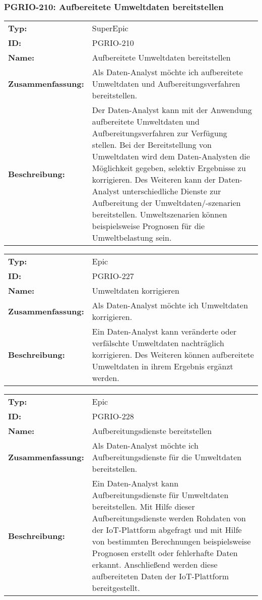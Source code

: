 	\subsubsection{PGRIO-210: Aufbereitete Umweltdaten bereitstellen} 
\begin{flushleft} 
\begin{tabular}{@{}lp{100mm}} 
\textbf{Typ:} & SuperEpic \\ 
\textbf{ID:} & PGRIO-210 \\ 
\textbf{Name:} & Aufbereitete Umweltdaten bereitstellen \\ 
\textbf{Zusammenfassung:} & Als Daten-Analyst möchte ich aufbereitete Umweltdaten und Aufbereitungsverfahren bereitstellen. \\ 
\textbf{Beschreibung:} & Der Daten-Analyst kann mit der Anwendung aufbereitete Umweltdaten und Aufbereitungsverfahren zur Verfügung stellen. Bei der Bereitstellung von Umweltdaten wird dem Daten-Analysten die Möglichkeit gegeben, selektiv Ergebnisse zu korrigieren. Des Weiteren kann der Daten-Analyst unterschiedliche Dienste zur Aufbereitung der Umweltdaten/-szenarien bereitstellen. Umweltszenarien können beispielsweise Prognosen für die Umweltbelastung sein. \\ 
\end{tabular} 
\end{flushleft} 

		\begin{flushleft} 
\begin{tabular}{@{}lp{100mm}} 
\textbf{Typ:} & Epic \\ 
\textbf{ID:} & PGRIO-227 \\ 
\textbf{Name:} & Umweltdaten korrigieren \\ 
\textbf{Zusammenfassung:} & Als Daten-Analyst möchte ich Umweltdaten korrigieren. \\ 
\textbf{Beschreibung:} & Ein Daten-Analyst kann veränderte oder verfälschte Umweltdaten nachträglich korrigieren. Des Weiteren können aufbereitete Umweltdaten in ihrem Ergebnis ergänzt werden. \\ 
\end{tabular} 
\end{flushleft} 

		\begin{flushleft} 
\begin{tabular}{@{}lp{100mm}} 
\textbf{Typ:} & Epic \\ 
\textbf{ID:} & PGRIO-228 \\ 
\textbf{Name:} & Aufbereitungsdienste bereitstellen \\ 
\textbf{Zusammenfassung:} & Als Daten-Analyst möchte ich Aufbereitungsdienste für die Umweltdaten bereitstellen. \\ 
\textbf{Beschreibung:} & Ein Daten-Analyst kann Aufbereitungsdienste für Umweltdaten bereitstellen. Mit Hilfe dieser Aufbereitungsdienste werden Rohdaten von der IoT-Plattform abgefragt und mit Hilfe von bestimmten Berechnungen beispielsweise Prognosen erstellt oder fehlerhafte Daten erkannt. Anschließend werden diese aufbereiteten Daten der IoT-Plattform bereitgestellt.
 \\ 
\end{tabular} 
\end{flushleft} 

